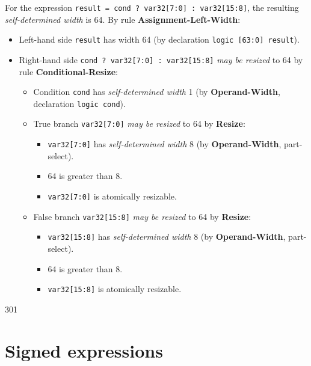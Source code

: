 \documentclass{article}
\newcommand{\sv}[1]{\texttt{#1}}
\newcommand{\sds}{\emph{self-determined width}}
\newcommand{\mbr}{\emph{may be resized}}
\begin{document}
For the expression \sv{result = cond ? var32[7:0] : var32[15:8]}, the
resulting \sds{} is 64. By rule \textbf{Assignment-Left-Width}:
\begin{itemize}
  \item Left-hand side \sv{result} has width 64 (by
    declaration \sv{logic [63:0] result}).
  \item Right-hand side \sv{cond ? var32[7:0] : var32[15:8]}
    \mbr{} to 64 by rule \textbf{Conditional-Resize}:
    \begin{itemize}
      \item Condition \sv{cond} has \sds{} 1 (by
        \textbf{Operand-Width}, declaration \sv{logic cond}).
      \item True branch \sv{var32[7:0]} \mbr{} to 64 by
        \textbf{Resize}:
        \begin{itemize}
          \item \sv{var32[7:0]} has \sds{} 8 (by
            \textbf{Operand-Width}, part-select).
          \item 64 is greater than 8.
          \item \sv{var32[7:0]} is atomically resizable.
        \end{itemize}
      \item False branch \sv{var32[15:8]} \mbr{} to 64 by
        \textbf{Resize}:
        \begin{itemize}
          \item \sv{var32[15:8]} has \sds{} 8 (by
            \textbf{Operand-Width}, part-select).
          \item 64 is greater than 8.
          \item \sv{var32[15:8]} is atomically resizable.
        \end{itemize}
    \end{itemize}
\end{itemize}

\renewcommand{\thesection}{11.\arabic{section}}
\setcounter{section}{6}

\begin{lrmquote}{11.7}{301}
  \section{Signed expressions}
  \textelp{}
\end{lrmquote}

\renewcommand{\thesection}{11.8.\arabic{section}}
\setcounter{section}{1}
\end{document}
